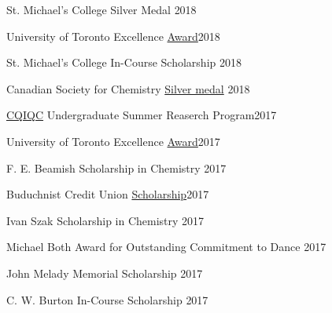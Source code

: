\documentclass[margin,line]{res}
\begin{document}
\begin{resume}
St. Michael's College Silver Medal \hfill {2018} 

\vspace*{-2mm}

University of Toronto Excellence \href{https://registrar.utoronto.ca/finances-and-funding/utea/}{Award}\hfill{2018}

\vspace*{-2mm}

St. Michael's College In-Course Scholarship \hfill {2018}

\vspace*{-2mm}

Canadian Society for Chemistry \href{https://www.cheminst.ca/awards/student/} {Silver medal} \hfill{2018} 

\vspace*{-2mm}

\href{https://cqiqc.physics.utoronto.ca/cqiqc-programs/undergraduates/}{CQIQC} Undergraduate Summer Reaserch Program\hfill{2017}

\vspace*{-2mm}

University of Toronto Excellence \href{https://registrar.utoronto.ca/finances-and-funding/utea/}{Award}\hfill{2017}

\vspace*{-2mm}

F. E. Beamish Scholarship in Chemistry \hfill{2017}

\vspace*{-2mm}

Buduchnist Credit Union \href{http://www.buduchnist.com/scholarships}{Scholarship}\hfill {2017}

\vspace*{-2mm}

Ivan Szak Scholarship in Chemistry \hfill {2017}

\vspace*{-2mm}

Michael Both Award for Outstanding Commitment to Dance %
\hfill {2017}

\vspace*{-2mm}

John Melady Memorial Scholarship \hfill{2017} 

\vspace*{-2mm}

C. W. Burton In-Course Scholarship \hfill{2017} 

\vspace*{-2mm}


\end{resume}
\end{document}
